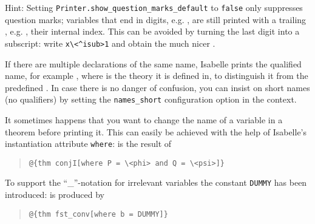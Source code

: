 \begin{isabellebody}
\begin{isamarkuptext}
Hint: Setting \verb|Printer.show_question_marks_default| to \texttt{false} only
suppresses question marks; variables that end in digits,
e.g. , are still printed with a trailing ,
e.g. , their internal index. This can be avoided by
turning the last digit into a subscript: write \verb!x\<^isub>1! and
obtain the much nicer .%
\end{isamarkuptext}%
\isamarkuptrue%
%
\isamarkuptrue%
%
\begin{isamarkuptext}%
If there are multiple declarations of the same name, Isabelle prints
the qualified name, for example , where  is the
theory it is defined in, to distinguish it from the predefined . In case there is no danger of confusion, you can insist on
short names (no qualifiers) by setting the \verb!names_short!
configuration option in the context.%
\end{isamarkuptext}%
\isamarkuptrue%
%
\isamarkuptrue%
%
\begin{isamarkuptext}%
It sometimes happens that you want to change the name of a
variable in a theorem before printing it. This can easily be achieved
with the help of Isabelle's instantiation attribute \texttt{where}:
 is the result of
\begin{quote}
\verb!@!\verb!{thm conjI[where P = \<phi> and Q = \<psi>]}!
\end{quote}
To support the ``\_''-notation for irrelevant variables
the constant \texttt{DUMMY} has been introduced:
 is produced by
\begin{quote}
\verb!@!\verb!{thm fst_conv[where b = DUMMY]}!

\end{quote}
\end{isamarkuptext}
\end{isabellebody}
